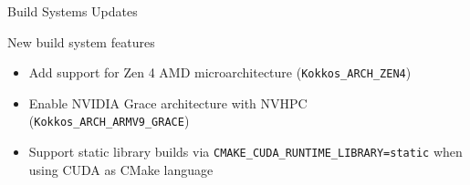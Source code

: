 
\begin{frame}[fragile]

  {\Huge Build Systems Updates}

  \vspace{10pt}

\end{frame}




\begin{frame}[fragile]{New build system features}
  \begin{itemize}
    \item Add support for Zen 4 AMD microarchitecture (\texttt{Kokkos\_ARCH\_ZEN4})
    \item Enable NVIDIA Grace architecture with NVHPC (\texttt{Kokkos\_ARCH\_ARMV9\_GRACE})
    \item Support static library builds via \texttt{CMAKE\_CUDA\_RUNTIME\_LIBRARY=static} when using CUDA as CMake language
  \end{itemize}

\end{frame}



